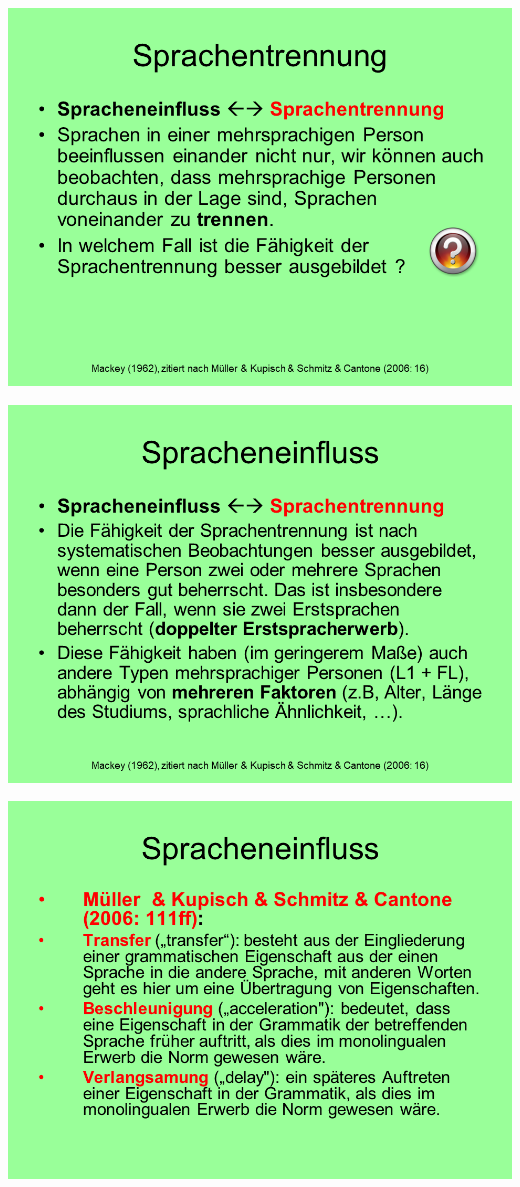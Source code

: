 \documentclass[
  letterpaper,
]{scrbook}
\begin{document}
\includegraphics[width=1\textwidth,height=\textheight]{./pictures/02_Spracheneinfluss_Sprachentrennung/Diapozitiv23.PNG}

\includegraphics[width=1\textwidth,height=\textheight]{./pictures/02_Spracheneinfluss_Sprachentrennung/Diapozitiv24.PNG}

\includegraphics[width=1\textwidth,height=\textheight]{./pictures/02_Spracheneinfluss_Sprachentrennung/Diapozitiv25.PNG}
\end{document}
